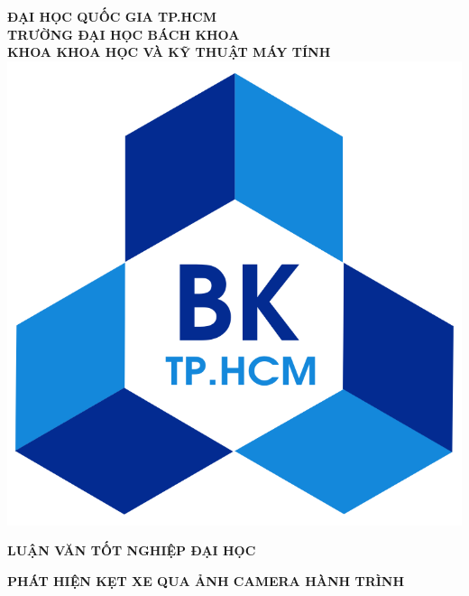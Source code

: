 \documentclass[12pt]{report}
\begin{document}
\begin{titlepage}

\begin{center}
	\textbf{{\fontsize{15}{15}\selectfont ĐẠI HỌC QUỐC GIA TP.HCM}}\\
	\textbf{{\fontsize{15}{15}\selectfont TRƯỜNG ĐẠI HỌC BÁCH KHOA}}\\
	\textbf{{\fontsize{15}{15}\selectfont KHOA KHOA HỌC VÀ KỸ THUẬT MÁY TÍNH}}\\
	\vspace{5mm}
	\includegraphics[scale=0.2]{charts/logo.png}
\end{center}
\vspace{5mm}

\begin{center}
	\textbf{{\fontsize{15}{15}\selectfont LUẬN VĂN TỐT NGHIỆP ĐẠI HỌC}}
\end{center}
\begin{center}
\textbf{{\fontsize{22}{15}\selectfont PHÁT HIỆN KẸT XE QUA ẢNH CAMERA HÀNH TRÌNH}}
\end{center}


\end{titlepage}
\end{document}
